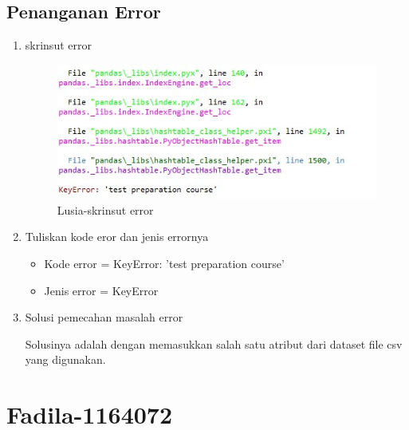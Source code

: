 \subsection{Penanganan Error}
\begin{enumerate}
	\item skrinsut error
		\begin{figure}[ht]
		\centering
		\includegraphics[scale=0.5]{figures/o1.jpg}
		\caption{Lusia-skrinsut error}
		\label{contoh}
		\end{figure}
	\item Tuliskan kode eror dan jenis errornya
		\begin{itemize}
		\item Kode error = KeyError: 'test preparation course'
		\item Jenis error = KeyError
		\end{itemize}
	\item Solusi pemecahan masalah error
		\par Solusinya adalah dengan memasukkan salah satu atribut dari dataset file csv yang digunakan.
\end{enumerate}


\section{Fadila-1164072}
